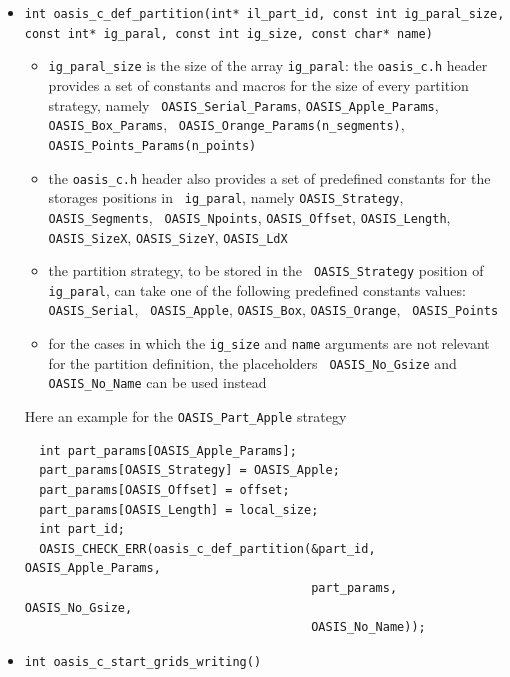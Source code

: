 \begin{itemize}
\vspace{0.2cm}
\item {\tt int oasis\_c\_def\_partition(int* il\_part\_id, const int ig\_paral\_size, const int* ig\_paral, const int ig\_size, const char* name)}
  \begin{itemize}
  \item {\tt ig\_paral\_size} is the size of the array {\tt ig\_paral}: the
    {\tt oasis\_c.h} header provides a set of constants and macros for
    the size of every partition strategy, namely {\tt
      OASIS\_Serial\_Params}, {\tt OASIS\_Apple\_Params}, {\tt
      OASIS\_Box\_Params}, {\tt
      OASIS\_Orange\_Params(n\_segments)}, {\tt
      OASIS\_Points\_Params(n\_points)}
  \item the {\tt oasis\_c.h} header also provides a set of predefined
    constants for the storages positions in {\tt
    ig\_paral}, namely {\tt OASIS\_Strategy}, {\tt OASIS\_Segments}, {\tt
    OASIS\_Npoints}, {\tt OASIS\_Offset}, {\tt OASIS\_Length}, {\tt
    OASIS\_SizeX}, {\tt OASIS\_SizeY}, {\tt OASIS\_LdX}
  \item the partition strategy, to be stored in the {\tt
    OASIS\_Strategy} position of {\tt ig\_paral}, can take one of the
    following predefined constants values: {\tt OASIS\_Serial}, {\tt
      OASIS\_Apple}, {\tt OASIS\_Box}, {\tt OASIS\_Orange}, {\tt
      OASIS\_Points}
  \item for the cases in which the {\tt ig\_size} and {\tt name}
    arguments are
    not relevant for the partition definition, the placeholders {\tt
      OASIS\_No\_Gsize} and {\tt OASIS\_No\_Name} can be used instead
  \end{itemize}
  Here an example for the {\tt OASIS\_Part\_Apple} strategy
\begin{verbatim}
  int part_params[OASIS_Apple_Params];
  part_params[OASIS_Strategy] = OASIS_Apple;
  part_params[OASIS_Offset] = offset;
  part_params[OASIS_Length] = local_size;
  int part_id;
  OASIS_CHECK_ERR(oasis_c_def_partition(&part_id, OASIS_Apple_Params,
                                        part_params, OASIS_No_Gsize,
                                        OASIS_No_Name));
\end{verbatim}

\vspace{0.2cm}
\item {\tt int oasis\_c\_start\_grids\_writing()}


\end{itemize}

